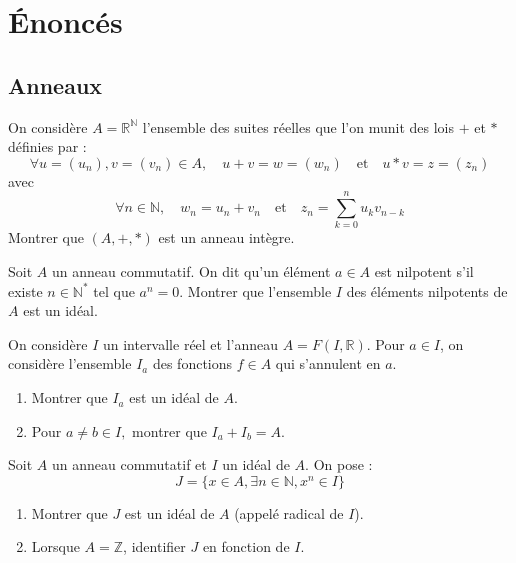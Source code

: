 \section{Énoncés}
\setcounter{numexo}{15}

\subsection{Anneaux}

\begin{exercice}
On considère $A=\mathbb{R}^{\mathbb{N}}$ l'ensemble des suites réelles que l'on munit des lois $+$ et $*$ définies par : 
\[\forall u=(u_{n}), v=(v_{n}) \in A, \quad u+v=w=(w_{n}) \quad \text{et} \quad u*v=z=(z_{n})\]
avec 
\[\forall n\in\mathbb{N}, \quad w_{n}=u_{n}+v_{n} \quad \text{et} \quad z_{n}=\sum_{k=0}^{n}u_{k}v_{n-k}\]
Montrer que $(A,+,*)$ est un anneau intègre. 
\end{exercice}

\begin{exercice}
Soit $A$ un anneau commutatif. On dit qu'un élément $a\in A$ est nilpotent s'il existe $n\in\mathbb{N}^{*}$ tel que $a^{n}=0$. 
Montrer que l'ensemble $I$ des éléments nilpotents de $A$ est un idéal. 
\end{exercice}

\begin{exercice}
On considère $I$ un intervalle réel et l'anneau $A=F(I,\mathbb{R})$. 
Pour $a\in I$, on considère l'ensemble $I_{a}$ des fonctions $f\in A$ qui s'annulent en $a$. 
\begin{enumerate}
    \item Montrer que $I_{a}$ est un idéal de $A$. 
    \item Pour $a\ne b\in I,$ montrer que $I_{a}+I_{b}=A$. 
\end{enumerate}
\end{exercice}

\begin{exercice}
Soit $A$ un anneau commutatif et $I$ un idéal de $A$. 
On pose :
\[J=\{x\in A,\exists n\in\mathbb{N},x^{n}\in I\}\]
\begin{enumerate}
    \item Montrer que $J$ est un idéal de $A$ (appelé radical de $I$). 
    \item Lorsque $A=\mathbb{Z}$, identifier $J$ en fonction de $I$. 
\end{enumerate}
\end{exercice}

